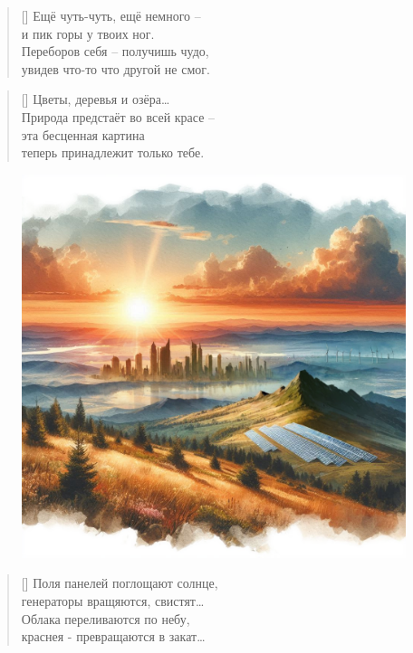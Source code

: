 \documentclass[a5paper,11pt]{memoir}
\begin{document}
\begin{verse}[\versewidth]
Ещё чуть-чуть, ещё немного -- \\
и пик горы у твоих ног.\\
Переборов себя -- получишь чудо,\\
увидев что-то что другой не смог.
\end{verse}


\clearpage

\begin{verse}[\versewidth]
Цветы, деревья и озёра\ldots\\
Природа предстаёт во всей красе -- \\
эта бесценная картина\\
теперь принадлежит только тебе.
\end{verse}

\begin{figure}[h]
	\vspace{-30pt}
	\hspace{-32pt}
	\includegraphics[width=\paperwidth]{images/skyline.png}
\end{figure}
\vspace{-30pt}

\begin{verse}[\versewidth]
Поля панелей поглощают солнце,\\
генераторы вращяются, свистят\ldots\\
Облака переливаются по небу,\\
краснея - превращаются в закат\ldots
\end{verse}
\end{document}

